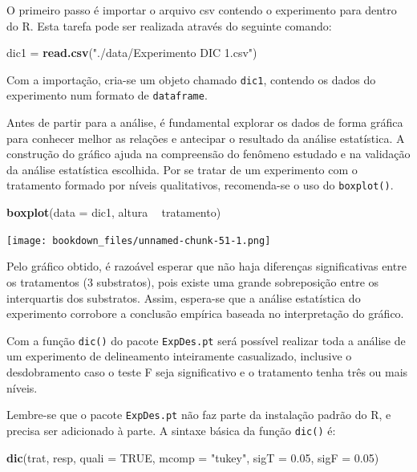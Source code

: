 \documentclass[
]{article}
\newenvironment{Shaded}{\begin{snugshade}}{\end{snugshade}}
\newcommand{\DataTypeTok}[1]{\textcolor[rgb]{0.13,0.29,0.53}{#1}}
\newcommand{\FloatTok}[1]{\textcolor[rgb]{0.00,0.00,0.81}{#1}}
\newcommand{\KeywordTok}[1]{\textcolor[rgb]{0.13,0.29,0.53}{\textbf{#1}}}
\newcommand{\NormalTok}[1]{#1}
\newcommand{\OperatorTok}[1]{\textcolor[rgb]{0.81,0.36,0.00}{\textbf{#1}}}
\newcommand{\OtherTok}[1]{\textcolor[rgb]{0.56,0.35,0.01}{#1}}
\newcommand{\StringTok}[1]{\textcolor[rgb]{0.31,0.60,0.02}{#1}}
\begin{document}
O primeiro passo é importar o arquivo csv contendo o experimento para dentro do R. Esta tarefa pode ser realizada através do seguinte comando:

\begin{Shaded}
\begin{Highlighting}[]
\NormalTok{dic1 =}\StringTok{ }\KeywordTok{read.csv}\NormalTok{(}\StringTok{"./data/Experimento DIC 1.csv"}\NormalTok{)}
\end{Highlighting}
\end{Shaded}

Com a importação, cria-se um objeto chamado \texttt{dic1}, contendo os dados do experimento num formato de \texttt{dataframe}.

Antes de partir para a análise, é fundamental explorar os dados de forma gráfica para conhecer melhor as relações e antecipar o resultado da análise estatística. A construção do gráfico ajuda na compreensão do fenômeno estudado e na validação da análise estatística escolhida. Por se tratar de um experimento com o tratamento formado por níveis qualitativos, recomenda-se o uso do \texttt{boxplot()}.

\begin{Shaded}
\begin{Highlighting}[]
\KeywordTok{boxplot}\NormalTok{(}\DataTypeTok{data =}\NormalTok{ dic1, altura }\OperatorTok{~}\StringTok{ }\NormalTok{tratamento)}
\end{Highlighting}
\end{Shaded}

\texttt{[image: bookdown\_files/unnamed-chunk-51-1.png]}

Pelo gráfico obtido, é razoável esperar que não haja diferenças significativas entre os tratamentos (3 substratos), pois existe uma grande sobreposição entre os interquartis dos substratos. Assim, espera-se que a análise estatística do experimento corrobore a conclusão empírica baseada no interpretação do gráfico.

Com a função \texttt{dic()} do pacote \texttt{ExpDes.pt} será possível realizar toda a análise de um experimento de delineamento inteiramente casualizado, inclusive o desdobramento caso o teste F seja significativo e o tratamento tenha três ou mais níveis.

Lembre-se que o pacote \texttt{ExpDes.pt} não faz parte da instalação padrão do R, e precisa ser adicionado à parte. A sintaxe básica da função \texttt{dic()} é:

\begin{Shaded}
\begin{Highlighting}[]
\KeywordTok{dic}\NormalTok{(trat, resp, }\DataTypeTok{quali =} \OtherTok{TRUE}\NormalTok{, }\DataTypeTok{mcomp =} \StringTok{"tukey"}\NormalTok{, }\DataTypeTok{sigT =} \FloatTok{0.05}\NormalTok{, }\DataTypeTok{sigF =} \FloatTok{0.05}\NormalTok{)}
\end{Highlighting}
\end{Shaded}
\end{document}
